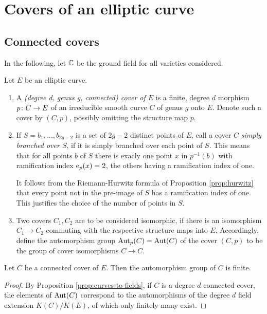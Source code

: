 \section{Covers of an elliptic curve}

\subsection{Connected covers}

In the following, let $\mathbb{C}$ be the ground field for all varieties considered.

\begin{defi} Let $E$ be an elliptic curve. 
 \begin{enumerate}
  \item A \emph{(degree d, genus g, connected) cover of $E$} is a finite, degree $d$ morphism $p\colon C\to E$ of an irreducible smooth curve $C$ of genus $g$ onto $E$. Denote such a cover by $(C,p)$, possibly omitting the structure map $p$.

  \item If $S={b_1,\dotsc,b_{2g-2}}$ is a set of $2g-2$ distinct points of $E$, call a cover $C$ \emph{simply branched over $S$}, if it is simply branched over each point of $S$. This means that for all points $b$ of $S$ there is exacly one point $x$ in $p^{-1}(b)$ with ramification index $\operatorname{e}_p(x)=2$, the others having a ramification index of one.
  
  It follows from the Riemann-Hurwitz formula of Proposition \ref{prop:hurwitz} that every point not in the pre-image of $S$ has a ramification index of one. This justifies the choice of the number of points in $S$.

  \item Two covers $C_1, C_2$ are to be considered isomorphic, if there is an isomorphism $C_1\to C_2$ commuting with the respective structure maps into $E$. Accordingly, define the automorphism group $\operatorname{Aut}_p(C)=\operatorname{Aut}(C)$ of the cover $(C,p)$ to be the group of cover isomorphisms $C\to C$. 
 \end{enumerate}
\end{defi}

\begin{prop}
 Let $C$ be a connected cover of $E$. Then the automorphism group of $C$ is finite.
\end{prop}

\begin{proof}
 By Proposition \ref{prop:curves-to-fields}, if $C$ is a degree $d$ connected cover, the elements of $\operatorname{Aut}(C)$ correspond to the automorphisms of the degree $d$ field extension $K(C)/K(E)$, of which only finitely many exist.
\end{proof}


